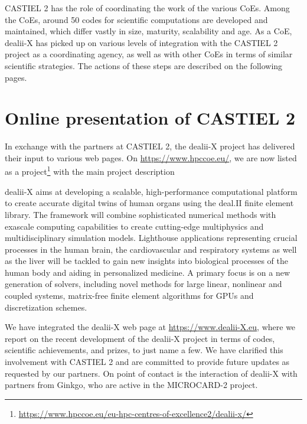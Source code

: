 \documentclass[a4paper,12pt]{article}
\begin{document}
CASTIEL 2 has the role of coordinating the work of the various CoEs. Among the
CoEs, around 50 codes for scientific computations are developed and
maintained, which differ vastly in size, maturity, scalability and age. As a
CoE, dealii-X has picked up on various levels of integration with the CASTIEL
2 project as a coordinating agency, as well as with other CoEs in terms of
similar scientific strategies. The actions of these steps are described on the
following pages.

\section{Online presentation of CASTIEL 2}

In exchange with the partners at CASTIEL 2, the dealii-X project has delivered
their input to various web pages. On \url{https://www.hpccoe.eu/}, we are now
listed as a
project\footnote{\url{https://www.hpccoe.eu/eu-hpc-centres-of-excellence2/dealii-x/}}
with the main project description

\begin{center}
  \begin{minipage}{0.8\textwidth}
    \textcolor{EUblue}{dealii-X} aims at developing a scalable,
    high-performance computational platform to create accurate digital twins
    of human organs using the deal.II finite element library. The framework
    will combine sophisticated numerical methods with exascale computing
    capabilities to create cutting-edge multiphysics and multidisciplinary
    simulation models. Lighthouse applications representing crucial processes
    in the human brain, the cardiovascular and respiratory systems as well as
    the liver will be tackled to gain new insights into biological processes
    of the human body and aiding in personalized medicine. A primary focus is
    on a new generation of solvers, including novel methods for large linear,
    nonlinear and coupled systems, matrix-free finite element algorithms for
    GPUs and discretization schemes.
  \end{minipage}
\end{center}

We have integrated the dealii-X web page at \url{https://www.dealii-X.eu},
where we report on the recent development of the dealii-X project in terms of
codes, scientific achievements, and prizes, to just name a few. We have
clarified this involvement with CASTIEL 2 and are committed to provide future
updates as requested by our partners. On point of contact is the interaction
of dealii-X with partners from Ginkgo, who are active in the MICROCARD-2
project.
\end{document}
